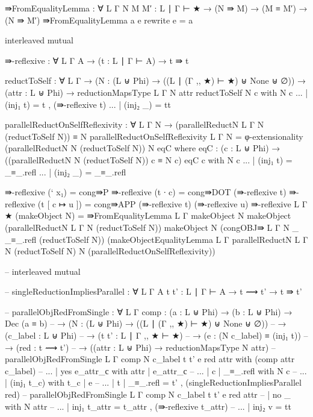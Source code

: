 {\begin{code}
⇛FromEqualityLemma : ∀ {L Γ} {N M M′ : L ∣ Γ ⊢ ★} → (N ⇛ M) → (M ≡ M′) → (N ⇛ M′)
⇛FromEqualityLemma a e rewrite e = a

interleaved mutual

  ⇛-reflexive : ∀ {L Γ A} → (t : L ∣ Γ ⊢ A) → t ⇛ t

  reductToSelf : ∀ {L Γ} → (N : (L ⊎ Phi) → ((L ∣ (Γ ,, ★) ⊢ ★) ⊎ None ⊎ ∅)) → (attr : L ⊎ Phi) → reductionMapsType {L} {Γ} N attr
  reductToSelf N c with N c
  ... | (inj₁ t) = t , (⇛-reflexive t)
  ... | (inj₂ _) = tt

  parallelReductOnSelfReflexivity : ∀ {L Γ N} → (parallelReductN {L} {Γ} N (reductToSelf N)) ≡ N
  parallelReductOnSelfReflexivity {L} {Γ} {N} = φ-extensionality (parallelReductN N (reductToSelf N)) N eqC where
    eqC : (c : L ⊎ Phi) → ((parallelReductN N (reductToSelf N)) c ≡ N c)
    eqC c with N c
    ... | (inj₁ t) = _≡_.refl
    ... | (inj₂ _) = _≡_.refl

  ⇛-reflexive (` x₁) = cong⇛P
  ⇛-reflexive (t ∙ c) = cong⇛DOT (⇛-reflexive t)
  ⇛-reflexive (t [ c ↦ u ]) = cong⇛APP (⇛-reflexive t) (⇛-reflexive u)
  ⇛-reflexive {L} {Γ} {★} (makeObject N) = 
    ⇛FromEqualityLemma {L} {Γ}
      {makeObject N}
      {makeObject (parallelReductN {L} {Γ} N (reductToSelf N))}
      {makeObject N}
      (congOBJ⇛ {L} {Γ} {N} {_} {_≡_.refl} (reductToSelf N))
      (makeObjectEqualityLemma {L} {Γ} {parallelReductN {L} {Γ} N (reductToSelf N)} {N} (parallelReductOnSelfReflexivity))

-- interleaved mutual

  -- singleReductionImpliesParallel : ∀ {L Γ A} {t t' : L ∣ Γ ⊢ A} → t ⟿ t' → t ⇛ t'

  -- parallelObjRedFromSingle : ∀ {L Γ} {comp : (a : L ⊎ Phi) → (b : L ⊎ Phi) → Dec (a ≡ b)}
  --   → (N : (L ⊎ Phi) → ((L ∣ (Γ ,, ★) ⊢ ★) ⊎ None ⊎ ∅)) 
  --   → (c_label : L ⊎ Phi) 
  --   → (t t' : L ∣ Γ ,, ★ ⊢ ★) 
  --   → (e : (N c_label) ≡ (inj₁ t)) 
  --   → (red : t ⟿ t') 
  --   → ((attr : L ⊎ Phi) → reductionMapsType N attr)
  -- parallelObjRedFromSingle {L} {Γ} {comp} N c_label t t' e red attr with (comp attr c_label)
  -- ... | yes e_attr_с with attr | e_attr_с
  -- ...   | c | _≡_.refl with N c
  -- ...     | (inj₁ t_c) with t_c | e
  -- ...       | t | _≡_.refl = t' , (singleReductionImpliesParallel red)
  -- parallelObjRedFromSingle {L} {Γ} {comp} N c_label t t' e red attr
  --     | no _ with N attr
  -- ...   | inj₁ t_attr = t_attr , (⇛-reflexive t_attr)
  -- ...   | inj₂ v = tt


\end{code}}

